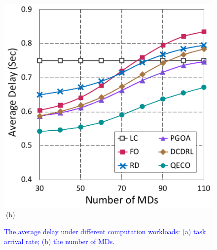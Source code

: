 \documentclass[10pt, journal,letterpaper]{IEEEtran}
\begin{document}
\begin{figure}[t]
\begin{minipage}[b]{0.50\linewidth}
		\includegraphics[width=\textwidth]{ delay_2}
		\textcolor{white}{i}\hspace{0.6cm}(b)
	\end{minipage}
	\vspace{-0.7cm}
	\caption{\textcolor{blue}{The average delay under different computation workloads: (a) task arrival rate; (b) the number of MDs.}}
	\label{chart3}
\end{figure} 
\end{document}
